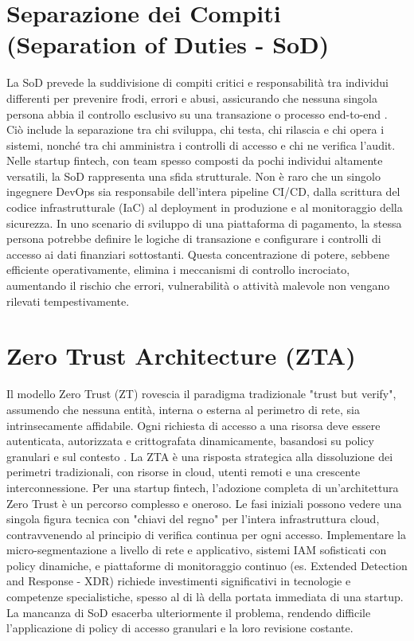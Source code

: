 \section{Separazione dei Compiti (Separation of Duties - SoD)}
La SoD prevede la suddivisione di compiti critici e responsabilità tra individui differenti per prevenire frodi, errori e abusi, assicurando che nessuna singola persona abbia il controllo esclusivo su una transazione o processo end-to-end \cite{OSCAL_Content}. Ciò include la separazione tra chi sviluppa, chi testa, chi rilascia e chi opera i sistemi, nonché tra chi amministra i controlli di accesso e chi ne verifica l'audit.
Nelle startup fintech, con team spesso composti da pochi individui altamente versatili, la SoD rappresenta una sfida strutturale. Non è raro che un singolo ingegnere DevOps sia responsabile dell'intera pipeline CI/CD, dalla scrittura del codice infrastrutturale (IaC) al deployment in produzione e al monitoraggio della sicurezza. In uno scenario di sviluppo di una piattaforma di pagamento, la stessa persona potrebbe definire le logiche di transazione e configurare i controlli di accesso ai dati finanziari sottostanti. Questa concentrazione di potere, sebbene efficiente operativamente, elimina i meccanismi di controllo incrociato, aumentando il rischio che errori, vulnerabilità o attività malevole non vengano rilevati tempestivamente.
\section{Zero Trust Architecture (ZTA)}
Il modello Zero Trust (ZT) rovescia il paradigma tradizionale "trust but verify", assumendo che nessuna entità, interna o esterna al perimetro di rete, sia intrinsecamente affidabile. Ogni richiesta di accesso a una risorsa deve essere autenticata, autorizzata e crittografata dinamicamente, basandosi su policy granulari e sul contesto \cite{NIST_SP_800_207}. La ZTA è una risposta strategica alla dissoluzione dei perimetri tradizionali, con risorse in cloud, utenti remoti e una crescente interconnessione.
Per una startup fintech, l'adozione completa di un'architettura Zero Trust è un percorso complesso e oneroso. Le fasi iniziali possono vedere una singola figura tecnica con "chiavi del regno" per l'intera infrastruttura cloud, contravvenendo al principio di verifica continua per ogni accesso. Implementare la micro-segmentazione a livello di rete e applicativo, sistemi IAM sofisticati con policy dinamiche, e piattaforme di monitoraggio continuo (es. Extended Detection and Response - XDR) richiede investimenti significativi in tecnologie e competenze specialistiche, spesso al di là della portata immediata di una startup. La mancanza di SoD esacerba ulteriormente il problema, rendendo difficile l'applicazione di policy di accesso granulari e la loro revisione costante.
